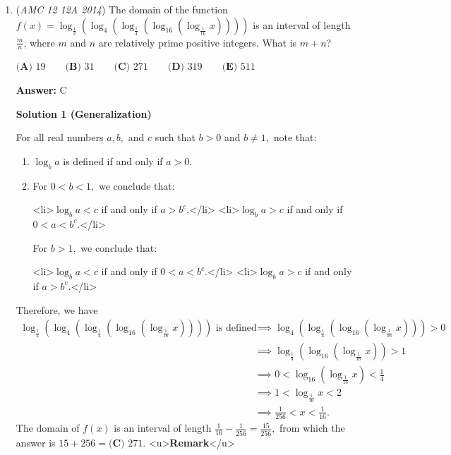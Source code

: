 \begin{enumerate}
 


 


	\item (\textit{AMC 12 12A 2014}) The domain of the function $f(x)=\log_{\frac12}(\log_4(\log_{\frac14}(\log_{16}(\log_{\frac1{16}}x))))$ is an interval of length $\frac mn$, where $m$ and $n$ are relatively prime positive integers.  What is $m+n$?


 $\textbf{(A) }19\qquad \textbf{(B) }31\qquad \textbf{(C) }271\qquad \textbf{(D) }319\qquad \textbf{(E) }511\qquad$

 \textbf{Answer: }C



\textbf{Solution 1 (Generalization)}

For all real numbers $a,b,$ and $c$ such that $b>0$ and $b\neq1,$ note that:

 
            \begin{enumerate} 
        \item $\log_b a$ is defined if and only if $a>0.$

        \item For $0<b<1,$ we conclude that:
            \begin{itemize}<li>$\log_b a<c$ if and only if $a>b^c.$</li>
<li>$\log_b a>c$ if and only if $0<a<b^c.$</li>

            \end{itemize}
            For $b>1,$ we conclude that:

 
            \begin{itemize}<li>$\log_b a<c$ if and only if $0<a<b^c.$</li>
<li>$\log_b a>c$ if and only if $a>b^c.$</li>

            \end{itemize}
            
            \end{enumerate}
            Therefore, we have
 \begin{align*} \log_{\frac12}(\log_4(\log_{\frac14}(\log_{16}(\log_{\frac1{16}}x)))) \text{ is defined} &\implies \log_4(\log_{\frac14}(\log_{16}(\log_{\frac1{16}}x)))>0 \\ &\implies \log_{\frac14}(\log_{16}(\log_{\frac1{16}}x))>1 \\ &\implies 0<\log_{16}(\log_{\frac1{16}}x)<\frac14 \\ &\implies 1<\log_{\frac1{16}}x<2 \\ &\implies \frac{1}{256}<x<\frac{1}{16}. \end{align*}
The domain of $f(x)$ is an interval of length $\frac{1}{16}-\frac{1}{256}=\frac{15}{256},$ from which the answer is $15+256=\boxed{\textbf{(C) }271}.$
<u>\textbf{Remark}</u>


\end{enumerate}
